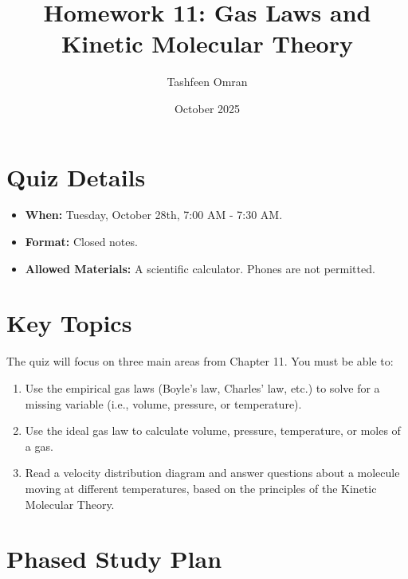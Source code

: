 \documentclass{article}
\title{Homework 11: Gas Laws and Kinetic Molecular Theory}
\author{Tashfeen Omran}
\date{October 2025}
\begin{document}
\maketitle

\section{Quiz Details}
\begin{itemize}
    \item \textbf{When:} Tuesday, October 28th, 7:00 AM - 7:30 AM.
    \item \textbf{Format:} Closed notes.
    \item \textbf{Allowed Materials:} A scientific calculator. Phones are not permitted.
\end{itemize}

\section{Key Topics}
The quiz will focus on three main areas from Chapter 11. You must be able to:
\begin{enumerate}
    \item Use the empirical gas laws (Boyle's law, Charles' law, etc.) to solve for a missing variable (i.e., volume, pressure, or temperature).
    \item Use the ideal gas law to calculate volume, pressure, temperature, or moles of a gas.
    \item Read a velocity distribution diagram and answer questions about a molecule moving at different temperatures, based on the principles of the Kinetic Molecular Theory.
\end{enumerate}

\section{Phased Study Plan}
\end{document}
